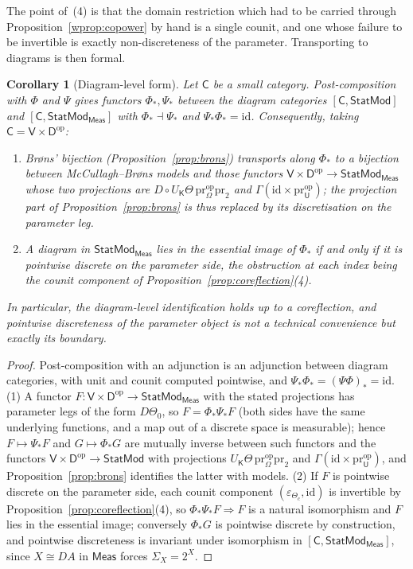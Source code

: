 \documentclass[11pt,a4paper]{article}
\theoremstyle{plain}
\newtheorem{corollary}[theorem]{Corollary}
\theoremstyle{definition}
\theoremstyle{remark}
\newcommand{\cat}[1]{\mathsf{#1}}
\newcommand{\catU}{\cat{U}}
\newcommand{\catV}{\cat{V}}
\newcommand{\catO}{\cat{\Omega}}
\newcommand{\catD}{\cat{D}}
\newcommand{\catK}{\cat{K}}
\newcommand{\Meas}{\cat{Meas}}
\newcommand{\op}{\mathrm{op}}
\newcommand{\id}{\mathrm{id}}
\newcommand{\pr}{\mathrm{pr}}
\newcommand{\StatMod}{\cat{StatMod}}
\newcommand{\Statk}{\StatMod_{\Meas}}
\begin{document}
The point of~(4) is that the domain restriction which had to be carried
through Proposition~\ref{wprop:copower} by hand is a single counit, and one
whose failure to be invertible is exactly non-discreteness of the parameter.
Transporting to diagrams is then formal.

\begin{corollary}[Diagram-level form]\label{cor:coreflection-diagrams}
Let $\cat{C}$ be a small category. Post-composition with $\Phi$ and $\Psi$
gives functors $\Phi_{*}, \Psi_{*}$ between the diagram categories
$[\cat{C}, \StatMod]$ and $[\cat{C}, \Statk]$ with $\Phi_{*} \dashv \Psi_{*}$
and $\Psi_{*}\Phi_{*} = \id$. Consequently, taking
$\cat{C} = \catV \times \catD^{\op}$:
\begin{enumerate}
\item Br\o ns' bijection (Proposition~\ref{prop:brons}) transports along
$\Phi_{*}$ to a bijection between McCullagh--Br\o ns models and those functors
$\catV \times \catD^{\op} \to \Statk$ whose two projections are
$D \circ U_\catK\Theta\,\pr_\catO^{\op}\pr_2$ and
$\Gamma(\id \times \pr_\catU^{\op})$; the projection part of
Proposition~\ref{prop:brons} is thus replaced by its discretisation on the
parameter leg.
\item A diagram in $\Statk$ lies in the essential image of $\Phi_{*}$ if and
only if it is pointwise discrete on the parameter side, the obstruction at
each index being the counit component of
Proposition~\ref{prop:coreflection}(4).
\end{enumerate}
In particular, the diagram-level identification holds up to a coreflection, and
pointwise discreteness of the parameter object is not a technical convenience
but exactly its boundary.
\end{corollary}

\begin{proof}
Post-composition with an adjunction is an adjunction between diagram
categories, with unit and counit computed pointwise, and
$\Psi_{*}\Phi_{*} = (\Psi\Phi)_{*} = \id$. (1) A functor
$F \colon \catV \times \catD^{\op} \to \Statk$ with the stated projections has
parameter legs of the form $D\Theta_0$, so $F = \Phi_{*}\Psi_{*}F$ (both sides have the same underlying functions, and a map out of a discrete
space is measurable); hence $F \mapsto \Psi_{*}F$ and $G \mapsto \Phi_{*}G$
are mutually inverse between such functors and the functors
$\catV \times \catD^{\op} \to \StatMod$ with projections
$U_\catK\Theta\,\pr_\catO^{\op}\pr_2$ and $\Gamma(\id \times \pr_\catU^{\op})$,
and Proposition~\ref{prop:brons} identifies the latter with models.
(2) If $F$ is pointwise discrete on the parameter side, each counit component
$(\varepsilon_{\Theta_c},\id)$ is invertible by
Proposition~\ref{prop:coreflection}(4), so $\Phi_{*}\Psi_{*}F \Rightarrow F$
is a natural isomorphism and $F$ lies in the essential image; conversely
$\Phi_{*}G$ is pointwise discrete by construction, and pointwise discreteness
is invariant under isomorphism in $[\cat{C},\Statk]$, since $X \cong DA$ in
$\Meas$ forces $\Sigma_X = 2^{X}$.
\end{proof}
\end{document}
